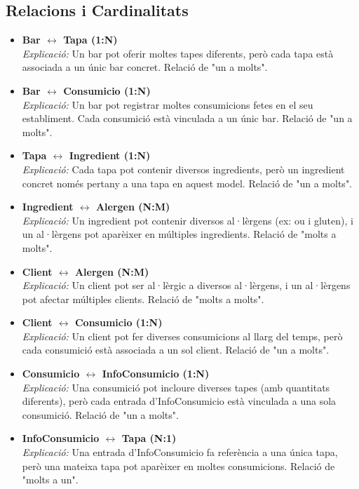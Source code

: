 \documentclass[12pt,a4paper]{article}
\begin{document}
\subsection{Relacions i Cardinalitats}

\begin{itemize}
    \item \textbf{Bar \(\longleftrightarrow\) Tapa (1:N)} \\
    \textit{Explicació:} Un bar pot oferir moltes tapes diferents, però cada tapa està associada a un únic bar concret. Relació de "un a molts".
    
    \item \textbf{Bar \(\longleftrightarrow\) Consumicio (1:N)} \\
    \textit{Explicació:} Un bar pot registrar moltes consumicions fetes en el seu establiment. Cada consumició està vinculada a un únic bar. Relació de "un a molts".
    
    \item \textbf{Tapa \(\longleftrightarrow\) Ingredient (1:N)} \\
    \textit{Explicació:} Cada tapa pot contenir diversos ingredients, però un ingredient concret només pertany a una tapa en aquest model. Relació de "un a molts".
    
    \item \textbf{Ingredient \(\longleftrightarrow\) Alergen (N:M)} \\
    \textit{Explicació:} Un ingredient pot contenir diversos al·lèrgens (ex: ou i gluten), i un al·lèrgens pot aparèixer en múltiples ingredients. Relació de "molts a molts".
    
    \item \textbf{Client \(\longleftrightarrow\) Alergen (N:M)} \\
    \textit{Explicació:} Un client pot ser al·lèrgic a diversos al·lèrgens, i un al·lèrgens pot afectar múltiples clients. Relació de "molts a molts".
    
    \item \textbf{Client \(\longleftrightarrow\) Consumicio (1:N)} \\
    \textit{Explicació:} Un client pot fer diverses consumicions al llarg del temps, però cada consumició està associada a un sol client. Relació de "un a molts".
    
    \item \textbf{Consumicio \(\longleftrightarrow\) InfoConsumicio (1:N)} \\
    \textit{Explicació:} Una consumició pot incloure diverses tapes (amb quantitats diferents), però cada entrada d’InfoConsumicio està vinculada a una sola consumició. Relació de "un a molts".
    
    \item \textbf{InfoConsumicio \(\longleftrightarrow\) Tapa (N:1)} \\
    \textit{Explicació:} Una entrada d’InfoConsumicio fa referència a una única tapa, però una mateixa tapa pot aparèixer en moltes consumicions. Relació de "molts a un".
\end{itemize}
\end{document}
